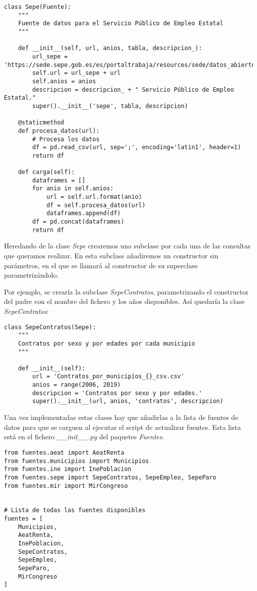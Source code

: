 \begin{lstlisting}[caption=Ejemplo de fuente de datos (Sepe)]
class Sepe(Fuente):
	"""
	Fuente de datos para el Servicio Público de Empleo Estatal
	"""

	def __init__(self, url, anios, tabla, descripcion_):
		url_sepe = 'https://sede.sepe.gob.es/es/portaltrabaja/resources/sede/datos_abiertos/datos/'
		self.url = url_sepe + url
		self.anios = anios
		descripcion = descripcion_ + " Servicio Público de Empleo Estatal."
		super().__init__('sepe', tabla, descripcion)

    @staticmethod
	def procesa_datos(url):
		# Procesa los datos
		df = pd.read_csv(url, sep=';', encoding='latin1', header=1)
		return df

	def carga(self):
		dataframes = []
		for anio in self.anios:
			url = self.url.format(anio)
			df = self.procesa_datos(url)
			dataframes.append(df)
		df = pd.concat(dataframes)
		return df
\end{lstlisting}

Heredando de la clase \textit{Sepe} crearemos una subclase por cada una de las consultas que queramos realizar. En esta subclase añadiremos un constructor sin parámetros, en el que se llamará al constructor de su superclase parametrizándolo.

Por ejemplo, se crearía la subclase \textit{SepeContratos}, parametrizando el constructor del padre con el nombre del fichero y los años disponibles. Así quedaría la clase \textit{SepeContratos}:

\begin{lstlisting}[caption=Ejemplo de fuente de datos (SepeContratos)]
class SepeContratos(Sepe):
	"""
	Contratos por sexo y por edades por cada municipio
	"""
	
	def __init__(self):
		url = 'Contratos_por_municipios_{}_csv.csv'
		anios = range(2006, 2019)
		descripcion = 'Contratos por sexo y por edades.'
		super().__init__(url, anios, 'contratos', descripcion)
\end{lstlisting}

Una vez implementadas estas clases hay que añadirlas a la lista de fuentes de datos para que se carguen al ejecutar el script de actualizar fuentes. Esta lista está en el fichero \textit{\_\_init\_\_.py} del paquetes \textit{Fuentes}.

\begin{lstlisting}[caption=Lista con todas las fuentes]
from fuentes.aeat import AeatRenta
from fuentes.municipios import Municipios
from fuentes.ine import InePoblacion
from fuentes.sepe import SepeContratos, SepeEmpleo, SepeParo
from fuentes.mir import MirCongreso


# Lista de todas las fuentes disponibles
fuentes = [
	Municipios,
	AeatRenta,
	InePoblacion,
	SepeContratos,
	SepeEmpleo,
	SepeParo,
	MirCongreso
]
\end{lstlisting}

